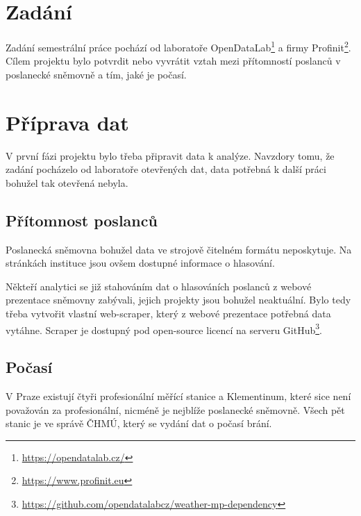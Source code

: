 \documentclass[12pt]{report}
\begin{document}

\tableofcontents
\pagebreak

\renewcommand{\thesection}{\arabic{section}}

\section{Zadání}

Zadání semestrální práce pochází od laboratoře OpenDataLab\footnote{\url{https://opendatalab.cz/}} a firmy Profinit\footnote{\url{https://www.profinit.eu}}. Cílem projektu bylo potvrdit nebo vyvrátit vztah mezi přítomností poslanců v poslanecké sněmovně a tím, jaké je počasí.

\section{Příprava dat}

V první fázi projektu bylo třeba připravit data k analýze. Navzdory tomu, že zadání pocházelo od laboratoře otevřených dat, data potřebná k další práci bohužel tak otevřená nebyla.

\subsection{Přítomnost poslanců}

Poslanecká sněmovna bohužel data ve strojově čitelném formátu neposkytuje. Na stránkách instituce jsou ovšem dostupné informace o hlasování.

Někteří analytici se již stahováním dat o hlasováních poslanců z webové prezentace sněmovny zabývali, jejich projekty jsou bohužel neaktuální. Bylo tedy třeba vytvořit vlastní web-scraper, který z webové prezentace potřebná data vytáhne. Scraper je dostupný pod open-source licencí na serveru GitHub\footnote{\url{https://github.com/opendatalabcz/weather-mp-dependency}}.

\subsection{Počasí}

V Praze existují čtyři profesionální měřící stanice a Klementinum, které sice není považován za profesionální, nicméně je nejblíže poslanecké sněmovně. Všech pět stanic je ve správě ČHMÚ, který se vydání dat o počasí brání.
\end{document}
